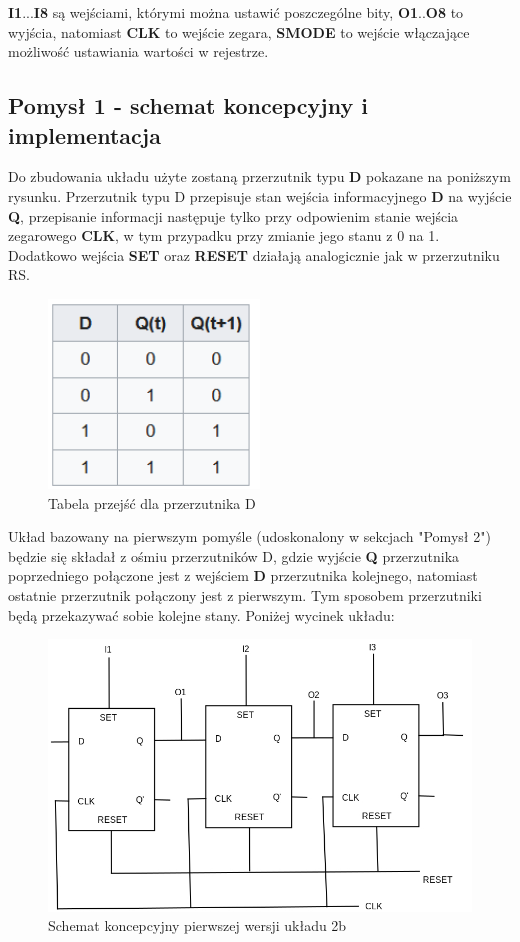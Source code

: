 \documentclass{article}
\begin{document}
\textbf{I1}...\textbf{I8} są wejściami, którymi można ustawić poszczególne bity, \textbf{O1}..\textbf{O8} to wyjścia, 
natomiast \textbf{CLK} to wejście zegara, \textbf{SMODE} to wejście włączające możliwość ustawiania wartości w rejestrze.

\subsection{Pomysł 1 - schemat koncepcyjny i implementacja}
Do zbudowania układu użyte zostaną przerzutnik typu \textbf{D} pokazane na poniższym rysunku. Przerzutnik typu D przepisuje stan
wejścia informacyjnego \textbf{D} na wyjście \textbf{Q}, przepisanie informacji następuje tylko przy odpowienim stanie wejścia zegarowego 
\textbf{CLK}, w tym przypadku przy zmianie jego stanu z 0 na 1. Dodatkowo wejścia \textbf{SET} oraz \textbf{RESET} działają analogicznie jak w przerzutniku RS.

\begin{figure}[H]
    \centering
    \includegraphics[width=0.5\textwidth]{przerzutnikD.png}
    \caption{Tabela przejść dla przerzutnika D}
\end{figure}

Układ bazowany na pierwszym pomyśle (udoskonalony w sekcjach "Pomysł 2") będzie się składał z ośmiu przerzutników D, gdzie wyjście \textbf{Q} przerzutnika poprzedniego połączone jest z wejściem
\textbf{D} przerzutnika kolejnego, natomiast ostatnie przerzutnik połączony jest z pierwszym. Tym sposobem przerzutniki będą przekazywać
sobie kolejne stany. Poniżej wycinek układu:


\begin{figure}[H]
    \centering
    \includegraphics[width=\textwidth]{2_schemat.jpg}
    \caption{Schemat koncepcyjny pierwszej wersji układu 2b} 
\end{figure}
\end{document}
